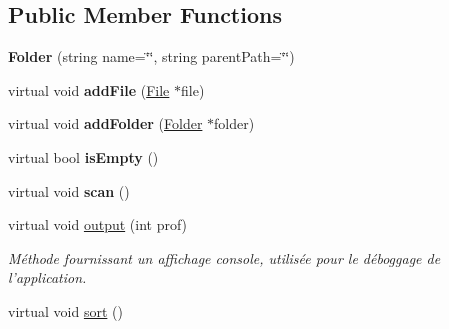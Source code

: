 \subsection*{Public Member Functions}
\begin{DoxyCompactItemize}
\item 
\hypertarget{class_folder_a1343307bec50716c05e7b4bbe8766107}{
{\bfseries Folder} (string name=\char`\"{}\char`\"{}, string parentPath=\char`\"{}\char`\"{})}
\label{class_folder_a1343307bec50716c05e7b4bbe8766107}

\item 
\hypertarget{class_folder_af9aba2368db9413043700f677492a124}{
virtual void {\bfseries addFile} (\hyperlink{class_file}{File} $\ast$file)}
\label{class_folder_af9aba2368db9413043700f677492a124}

\item 
\hypertarget{class_folder_ad49a379ebbc8ee2cdfaa717f45ed43bb}{
virtual void {\bfseries addFolder} (\hyperlink{class_folder}{Folder} $\ast$folder)}
\label{class_folder_ad49a379ebbc8ee2cdfaa717f45ed43bb}

\item 
\hypertarget{class_folder_a41312e8e97ced8682cef1866e312b9df}{
virtual bool {\bfseries isEmpty} ()}
\label{class_folder_a41312e8e97ced8682cef1866e312b9df}

\item 
\hypertarget{class_folder_a7fac3759935eacdd6876fc460704e991}{
virtual void {\bfseries scan} ()}
\label{class_folder_a7fac3759935eacdd6876fc460704e991}

\item 
virtual void \hyperlink{class_folder_af86ff443dfb2e8ad93daf847f23e1c0c}{output} (int prof)
\begin{DoxyCompactList}\small\item\em Méthode fournissant un affichage console, utilisée pour le déboggage de l'application. \item\end{DoxyCompactList}\item 
\hypertarget{class_folder_a187d0a1526df56146549e7570b03bd77}{
virtual void \hyperlink{class_folder_a187d0a1526df56146549e7570b03bd77}{sort} ()}
\label{class_folder_a187d0a1526df56146549e7570b03bd77}


\end{DoxyCompactItemize}
